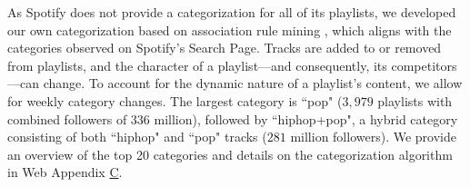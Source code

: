 


As Spotify does not provide a categorization for all of its playlists, we developed our own categorization based on association rule mining \citep{hastie_09}, which aligns with the categories observed on Spotify’s Search Page. Tracks are added to or removed from playlists, and the character of a playlist---and consequently, its competitors---can change. To account for the dynamic nature of a playlist's content, we allow for weekly category changes. %
The largest category is ``pop" ($3,979$ playlists with combined followers of $336$ million), followed by ``hiphop+pop", a hybrid category consisting of both ``hiphop" and ``pop" tracks ($281$ million followers). %
We provide an overview of the top 20 categories and details on the categorization algorithm in Web Appendix \hyperref[details_mining]{C}.





